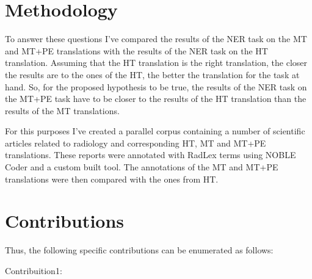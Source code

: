 \section{Methodology}

To answer these questions I've compared the results of the NER task on the MT and MT+PE translations with the results of the NER task on the HT translation. Assuming that the HT translation is the right translation, the closer the results are to the ones of the HT, the better the translation for the task at hand. So, for the proposed hypothesis to be true, the results of the NER task on the MT+PE task have to be closer to the results of the HT translation than the results of the MT translations.

For this purposes I've created a parallel corpus containing a number of scientific articles related to radiology and corresponding HT, MT and MT+PE translations. These reports were annotated with RadLex terms using NOBLE Coder and a custom built tool. The annotations of the MT and MT+PE translations were then compared with the ones from HT.


\section{Contributions}


Thus, the following specific contributions can be enumerated as follows:
\begin{description}
	\item[Contribuition1:] 
\end{description}


